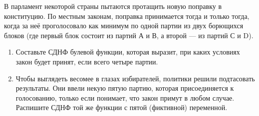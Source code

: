 \question
В парламент некоторой страны пытаются протащить новую поправку в конституцию. По местным законам, поправка принимается тогда и только тогда, когда за неё проголосовало как минимум по одной партии из двух борющихся блоков (где первый блок состоит из партий А и В, а второй — из партий С и D).

\begin{enumerate}
    \item Составьте СДНФ булевой функции, которая выразит, при каких условиях закон будет принят, если всего четыре партии.
    \item Чтобы выглядеть весомее в глазах избирателей, политики решили подтасовать результаты.  Они ввели некую пятую партию, которая присоединяется к голосованию, только если понимает, что закон примут в любом случае. Распишите СДНФ той же функции с пятой (фиктивной) переменной.
\end{enumerate}
